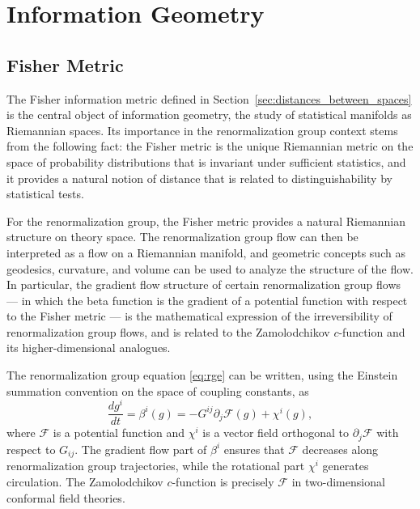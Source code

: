 \documentclass[11pt, twoside, openright]{book}
\theoremstyle{dotted}
\theoremstyle{definition}
\begin{document}
\chapter{Information Geometry}
\label{ch:info_geometry}

\section{Fisher Metric}

The Fisher information metric defined in Section~\ref{sec:distances_between_spaces}
is the central object of information geometry, the study of statistical manifolds
as Riemannian spaces. Its importance in the renormalization group context stems from
the following fact: the Fisher metric is the unique Riemannian metric on the space
of probability distributions that is invariant under sufficient statistics, and it
provides a natural notion of distance that is related to distinguishability by
statistical tests.

For the renormalization group, the Fisher metric provides a natural Riemannian
structure on theory space. The renormalization group flow can then be interpreted
as a flow on a Riemannian manifold, and geometric concepts such as geodesics,
curvature, and volume can be used to analyze the structure of the flow. In particular,
the gradient flow structure of certain renormalization group flows --- in which the
beta function is the gradient of a potential function with respect to the Fisher
metric --- is the mathematical expression of the irreversibility of renormalization
group flows, and is related to the Zamolodchikov $c$-function and its higher-dimensional
analogues.

The renormalization group equation \eqref{eq:rge} can be written, using the
Einstein summation convention on the space of coupling constants, as
\begin{equation}
  \frac{dg^i}{dt} = \beta^i(g) = -G^{ij}\partial_j \mathcal{F}(g) + \chi^i(g),
  \label{eq:gradient_flow}
\end{equation}
where $\mathcal{F}$ is a potential function and $\chi^i$ is a vector field
orthogonal to $\partial_j\mathcal{F}$ with respect to $G_{ij}$. The gradient flow
part of $\beta^i$ ensures that $\mathcal{F}$ decreases along renormalization group
trajectories, while the rotational part $\chi^i$ generates circulation. The
Zamolodchikov $c$-function is precisely $\mathcal{F}$ in two-dimensional conformal
field theories.
\end{document}
